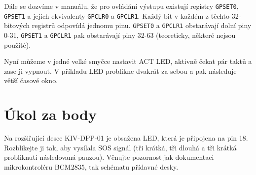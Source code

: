 \documentclass{article}
\begin{document}
Dále se dozvíme v manuálu, že pro ovládání výstupu existují registry \texttt{GPSET0}, \texttt{GPSET1} a jejich ekvivalenty \texttt{GPCLR0} a \texttt{GPCLR1}. Každý bit v každém z těchto 32-bitových registrů odpovídá jednomu pinu. \texttt{GPSET0} a \texttt{GPCLR1} obstarávají dolní piny 0-31, \texttt{GPSET1} a \texttt{GPCLR1} pak obstarávají piny 32-63 (teoreticky, některé nejsou použité).

Nyní můžeme v jedné velké smyčce nastavit ACT LED, aktivně čekat pár taktů a zase ji vypnout. V příkladu LED problikne dvakrát za sebou a pak následuje větší časové okno.

\section{Úkol za body}

Na rozšiřující desce KIV-DPP-01 je obsažena LED, která je připojena na pin 18. Rozblikejte ji tak, aby vysílala SOS signál (tři krátká, tři dlouhá a tři krátká probliknutí následovaná pauzou). Věnujte pozornost jak dokumentaci mikrokontroléru BCM2835, tak schématu přídavné desky.
\end{document}
